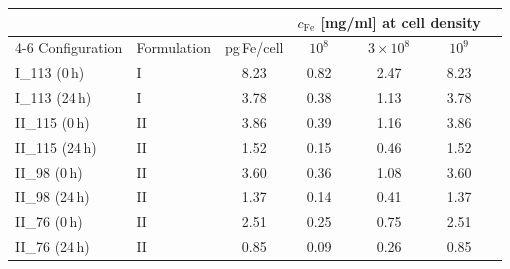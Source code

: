 \begin{tabular}{@{}llccccc@{}}
\toprule
 & & & \multicolumn{3}{c}{$c_{\mathrm{Fe}}$ [mg/ml] at cell density} \\
\cmidrule(l){4-6}
Configuration & Formulation & pg\,Fe/cell & $10^{8}$ & $3{\times}10^{8}$ & $10^{9}$ \\
\midrule
I\_113 (0\,h) & I & 8.23 & 0.82 & 2.47 & 8.23 \\
I\_113 (24\,h) & I & 3.78 & 0.38 & 1.13 & 3.78 \\
II\_115 (0\,h) & II & 3.86 & 0.39 & 1.16 & 3.86 \\
II\_115 (24\,h) & II & 1.52 & 0.15 & 0.46 & 1.52 \\
II\_98 (0\,h) & II & 3.60 & 0.36 & 1.08 & 3.60 \\
II\_98 (24\,h) & II & 1.37 & 0.14 & 0.41 & 1.37 \\
II\_76 (0\,h) & II & 2.51 & 0.25 & 0.75 & 2.51 \\
II\_76 (24\,h) & II & 0.85 & 0.09 & 0.26 & 0.85 \\
\bottomrule
\end{tabular}